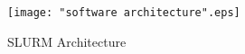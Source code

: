 \documentclass[a4paper, 12pt]{article}
\begin{document}
\clearpage
\begin{figure}[h]
\centering
\vspace{-0.15in}
\texttt{[image: "software architecture".eps]}
\caption{SLURM Architecture}
\label{fig:7}
\end{figure}
\clearpage
\clearpage
\end{document}
